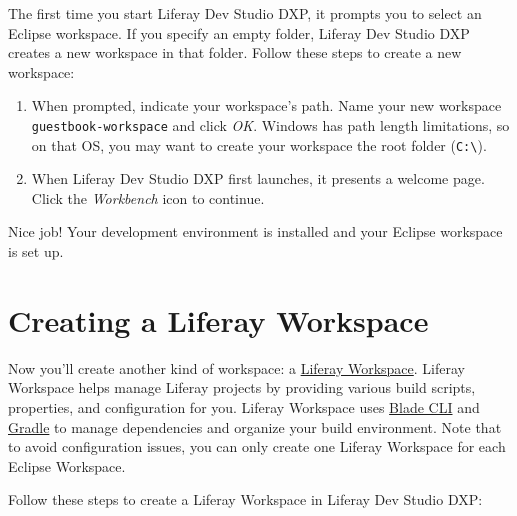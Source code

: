 The first time you start Liferay Dev Studio DXP, it prompts you to
select an Eclipse workspace. If you specify an empty folder, Liferay Dev
Studio DXP creates a new workspace in that folder. Follow these steps to
create a new workspace:

\begin{enumerate}
\def\labelenumi{\arabic{enumi}.}
\item
  When prompted, indicate your workspace's path. Name your new workspace
  \texttt{guestbook-workspace} and click \emph{OK}. Windows has path
  length limitations, so on that OS, you may want to create your
  workspace the root folder (\texttt{C:\textbackslash{}}).
\item
  When Liferay Dev Studio DXP first launches, it presents a welcome
  page. Click the \emph{Workbench} icon to continue.
\end{enumerate}

Nice job! Your development environment is installed and your Eclipse
workspace is set up.

\section{Creating a Liferay
Workspace}\label{creating-a-liferay-workspace}

Now you'll create another kind of workspace: a
\href{/docs/7-2/reference/-/knowledge_base/r/liferay-workspace}{Liferay
Workspace}. Liferay Workspace helps manage Liferay projects by providing
various build scripts, properties, and configuration for you. Liferay
Workspace uses
\href{/docs/7-2/reference/-/knowledge_base/r/blade-cli}{Blade CLI} and
\href{https://gradle.org/}{Gradle} to manage dependencies and organize
your build environment. Note that to avoid configuration issues, you can
only create one Liferay Workspace for each Eclipse Workspace.

Follow these steps to create a Liferay Workspace in Liferay Dev Studio
DXP:

